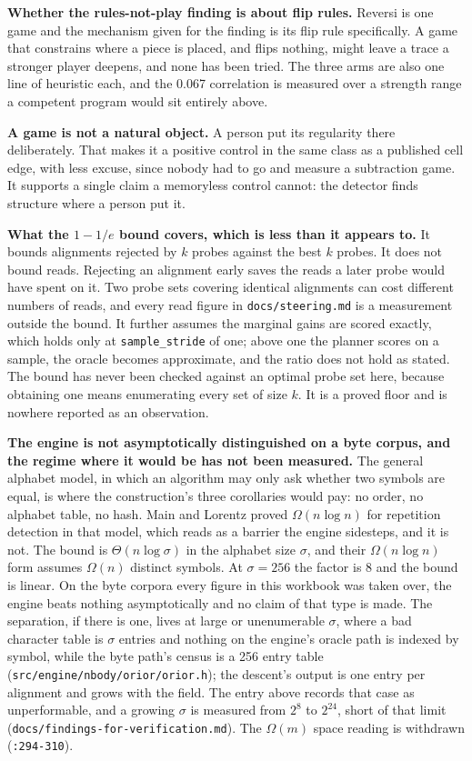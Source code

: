 \textbf{Whether the rules-not-play finding is about flip rules.} Reversi is one game and the mechanism given for the finding is its flip rule specifically. A game that constrains where a piece is placed, and flips nothing, might leave a trace a stronger player deepens, and none has been tried. The three arms are also one line of heuristic each, and the 0.067 correlation is measured over a strength range a competent program would sit entirely above.

\textbf{A game is not a natural object.} A person put its regularity there deliberately. That makes it a positive control in the same class as a published cell edge, with less excuse, since nobody had to go and measure a subtraction game. It supports a single claim a memoryless control cannot: the detector finds structure where a person put it.

\textbf{What the \(1 - 1/e\) bound covers, which is less than it appears to.} It bounds alignments rejected by \(k\) probes against the best \(k\) probes. It does not bound reads. Rejecting an alignment early saves the reads a later probe would have spent on it. Two probe sets covering identical alignments can cost different numbers of reads, and every read figure in \texttt{docs/\allowbreak{}steering.md} is a measurement outside the bound. It further assumes the marginal gains are scored exactly, which holds only at \texttt{sample\_stride} of one; above one the planner scores on a sample, the oracle becomes approximate, and the ratio does not hold as stated. The bound has never been checked against an optimal probe set here, because obtaining one means enumerating every set of size \(k\). It is a proved floor and is nowhere reported as an observation.

\textbf{The engine is not asymptotically distinguished on a byte corpus, and the regime where it would be has not been measured.} The general alphabet model, in which an algorithm may only ask whether two symbols are equal, is where the construction's three corollaries would pay: no order, no alphabet table, no hash. Main and Lorentz proved \(\Omega(n \log n)\) for repetition detection in that model, which reads as a barrier the engine sidesteps, and it is not. The bound is \(\Theta(n \log \sigma)\) in the alphabet size \(\sigma\), and their \(\Omega(n \log n)\) form assumes \(\Omega(n)\) distinct symbols. At \(\sigma = 256\) the factor is 8 and the bound is linear. On the byte corpora every figure in this workbook was taken over, the engine beats nothing asymptotically and no claim of that type is made. The separation, if there is one, lives at large or unenumerable \(\sigma\), where a bad character table is \(\sigma\) entries and nothing on the engine's oracle path is indexed by symbol, while the byte path's census is a 256 entry table (\texttt{src/\allowbreak{}engine/\allowbreak{}nbody/\allowbreak{}orior/\allowbreak{}orior.h}); the descent's output is one entry per alignment and grows with the field. The entry above records that case as unperformable, and a growing \(\sigma\) is measured from \(2^8\) to \(2^{24}\), short of that limit (\texttt{docs/\allowbreak{}findings-\allowbreak{}for-\allowbreak{}verification.md}). The \(\Omega(m)\) space reading is withdrawn (\texttt{:294-310}).

